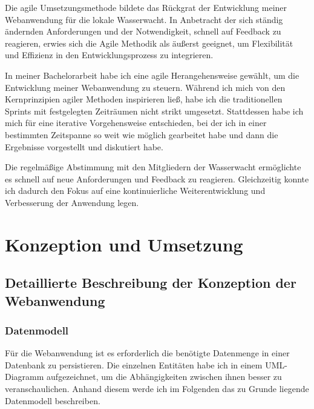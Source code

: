 \documentclass[fontsize=12pt,openright,oneside,paper=a4,BCOR=1cm]{scrbook}
\begin{document}
Die agile Umsetzungsmethode bildete das Rückgrat der Entwicklung meiner Webanwendung für die lokale Wasserwacht. In Anbetracht der sich ständig ändernden Anforderungen und der Notwendigkeit, schnell auf Feedback zu reagieren, erwies sich die Agile Methodik als äußerst geeignet, um Flexibilität und Effizienz in den Entwicklungsprozess zu integrieren.

In meiner Bachelorarbeit habe ich eine agile Herangehensweise gewählt, um die Entwicklung meiner Webanwendung zu steuern. Während ich mich von den Kernprinzipien agiler Methoden inspirieren ließ, habe ich die traditionellen Sprints mit festgelegten Zeiträumen nicht strikt umgesetzt. Stattdessen habe ich mich für eine iterative Vorgehensweise entschieden, bei der ich in einer bestimmten Zeitspanne so weit wie möglich gearbeitet habe und dann die Ergebnisse vorgestellt und diskutiert habe. 

Die regelmäßige Abstimmung mit den Mitgliedern der Wasserwacht ermöglichte es schnell auf neue Anforderungen und Feedback zu reagieren. Gleichzeitig konnte ich dadurch den Fokus auf eine kontinuierliche Weiterentwicklung und Verbesserung der Anwendung legen.

%
%

\renewcommand{\cleardoublepage}{}
\chapter{Konzeption und Umsetzung}

\section{Detaillierte Beschreibung der Konzeption der Webanwendung}

\subsection{Datenmodell}

Für die Webanwendung ist es erforderlich die benötigte Datenmenge in einer Datenbank zu persistieren. Die einzelnen Entitäten habe ich in einem UML-Diagramm aufgezeichnet, um die Abhängigkeiten zwischen ihnen besser zu veranschaulichen. Anhand diesem werde ich im Folgenden das zu Grunde liegende Datenmodell beschreiben.
\end{document}
